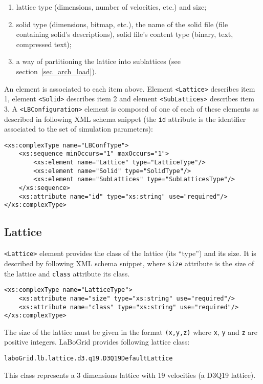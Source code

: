 \begin{enumerate}
	\item lattice type (dimensions, number of velocities, etc.) and size;
	\item solid type (dimensions, bitmap, etc.), the name of the solid file (file
	containing solid's descriptions), solid file's content type (binary, text,
	compressed text);
	\item a way of partitioning the lattice into sublattices (see
	section~\ref{sec_arch_load}).
\end{enumerate}

An element is associated to each item above. Element \verb|<Lattice>| describes
item 1, element \verb|<Solid>| describes item 2 and element \verb|<SubLattices>|
describes item 3. A \verb|<LBConfiguration>| element is composed of one of each
of these elements as described in following XML schema snippet (the \texttt{id}
attribute is the identifier associated to the set of simulation parameters):

\begin{Verbatim}[tabsize=2,frame=lines]
<xs:complexType name="LBConfType">
	<xs:sequence minOccurs="1" maxOccurs="1">
		<xs:element name="Lattice" type="LatticeType"/>
		<xs:element name="Solid" type="SolidType"/>
		<xs:element name="SubLattices" type="SubLatticesType"/>
	</xs:sequence>
	<xs:attribute name="id" type="xs:string" use="required"/>
</xs:complexType>
\end{Verbatim}


\subsection{Lattice}
\label{sec_conf_lbConf_latt}

\verb|<Lattice>| element provides the class of the lattice (its ``type'')
and its size. It is described by following XML schema snippet, where
\texttt{size} attribute is the size of the lattice and \texttt{class}
attribute its class.

\begin{Verbatim}[tabsize=2,frame=lines]
<xs:complexType name="LatticeType">
	<xs:attribute name="size" type="xs:string" use="required"/>
	<xs:attribute name="class" type="xs:string" use="required"/>
</xs:complexType>
\end{Verbatim}

The size of the lattice must be given in the format \texttt{(x,y,z)} where
\texttt{x}, \texttt{y} and \texttt{z} are positive integers. LaBoGrid provides
following lattice class:
%
\begin{center}
\texttt{laboGrid.lb.lattice.d3.q19.D3Q19DefaultLattice}
\end{center}
%
This class represents a 3 dimensions lattice with 19 velocities (a D3Q19
lattice).


